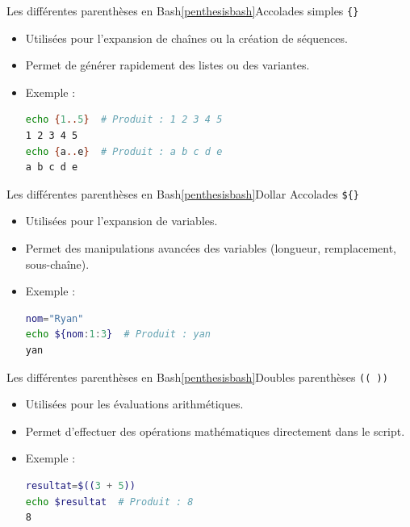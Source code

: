 \documentclass{beamer}
\begin{document}
    \begin{frame}[fragile]{Les différentes parenthèses en Bash\cref{penthesisbash}}{Accolades simples \texttt{\{\}}}
        \begin{itemize}
            \item Utilisées pour l'expansion de chaînes ou la création de séquences.
            \item Permet de générer rapidement des listes ou des variantes.
            \item Exemple :
            \begin{lstlisting}[language=bash]
echo {1..5}  # Produit : 1 2 3 4 5
1 2 3 4 5
echo {a..e}  # Produit : a b c d e
a b c d e
            \end{lstlisting}
        \end{itemize}
    \end{frame}

    \begin{frame}[fragile]{Les différentes parenthèses en Bash\cref{penthesisbash}}{Dollar Accolades \texttt{\$\{\}}}
        \begin{itemize}
            \item Utilisées pour l'expansion de variables.
            \item Permet des manipulations avancées des variables (longueur, remplacement, sous-chaîne).
            \item Exemple :
            \begin{lstlisting}[language=bash]
nom="Ryan"
echo ${nom:1:3}  # Produit : yan
yan
            \end{lstlisting}
        \end{itemize}
    \end{frame}

    \begin{frame}[fragile]{Les différentes parenthèses en Bash\cref{penthesisbash}}{Doubles parenthèses \lstinline{(( ))}}
        \begin{itemize}
            \item Utilisées pour les évaluations arithmétiques.
            \item Permet d'effectuer des opérations mathématiques directement dans le script.
            \item Exemple :
            \begin{lstlisting}[language=bash]
resultat=$((3 + 5))
echo $resultat  # Produit : 8
8
            \end{lstlisting}
        \end{itemize}
    \end{frame}
\end{document}
